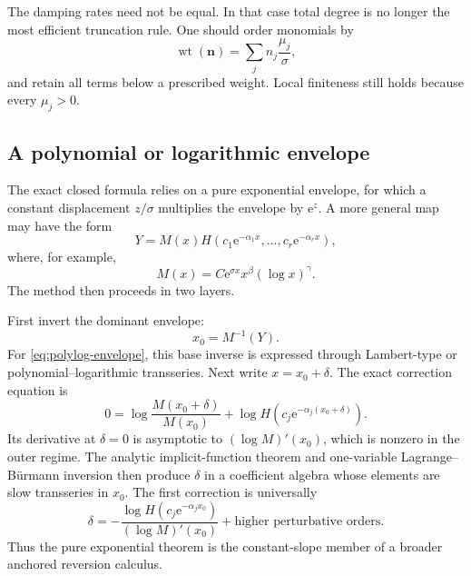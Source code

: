 \documentclass[11pt,oneside]{article}
\theoremstyle{plain}
\theoremstyle{definition}
\theoremstyle{remark}
\newcommand{\e}{\mathrm{e}}
\begin{document}
The damping rates need not be equal.  In that case total degree is no longer
the most efficient truncation rule.  One should order monomials by
\begin{equation}
 \operatorname{wt}(\bm n)
 =\sum_jn_j\frac{\mu_j}{\sigma},
 \label{eq:nonuniform-weight}
\end{equation}
and retain all terms below a prescribed weight.  Local finiteness still holds
because every \(\mu_j>0\).

\subsection{A polynomial or logarithmic envelope}

The exact closed formula relies on a pure exponential envelope, for which a
constant displacement \(z/\sigma\) multiplies the envelope by \(\e^z\).  A
more general map may have the form
\begin{equation}
 Y=M(x)H\!\left(c_1\e^{-\alpha_1x},\ldots,c_r\e^{-\alpha_rx}\right),
 \label{eq:general-envelope}
\end{equation}
where, for example,
\begin{equation}
 M(x)=C\e^{\sigma x}x^\beta(\log x)^\gamma.
 \label{eq:polylog-envelope}
\end{equation}
The method then proceeds in two layers.

First invert the dominant envelope:
\begin{equation}
 x_0=M^{-1}(Y).
 \label{eq:base-inverse}
\end{equation}
For \eqref{eq:polylog-envelope}, this base inverse is expressed through
Lambert-type or polynomial--logarithmic transseries.  Next write
\(x=x_0+\delta\).  The exact correction equation is
\begin{equation}
 0=\log\frac{M(x_0+\delta)}{M(x_0)}
 +\log H\!\left(c_j\e^{-\alpha_j(x_0+\delta)}\right).
 \label{eq:anchored-general-envelope}
\end{equation}
Its derivative at \(\delta=0\) is asymptotic to
\((\log M)'(x_0)\), which is nonzero in the outer regime.  The analytic
implicit-function theorem and one-variable Lagrange--B\"urmann inversion then
produce \(\delta\) in a coefficient algebra whose elements are slow
transseries in \(x_0\).  The first correction is universally
\begin{equation}
 \delta
 =-\frac{\log H(c_j\e^{-\alpha_jx_0})}
        {(\log M)'(x_0)}
 +\text{higher perturbative orders}.
 \label{eq:first-general-envelope-correction}
\end{equation}
Thus the pure exponential theorem is the constant-slope member of a broader
anchored reversion calculus.
\end{document}

